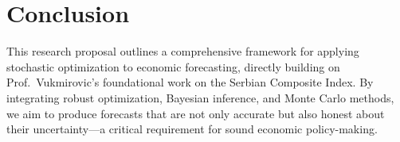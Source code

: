 \documentclass[12pt,a4paper]{article}
\begin{document}
\section{Conclusion}

This research proposal outlines a comprehensive framework for applying stochastic optimization to economic forecasting, directly building on Prof.\ Vukmirovic's foundational work on the Serbian Composite Index. By integrating robust optimization, Bayesian inference, and Monte Carlo methods, we aim to produce forecasts that are not only accurate but also honest about their uncertainty---a critical requirement for sound economic policy-making.

\end{document}
